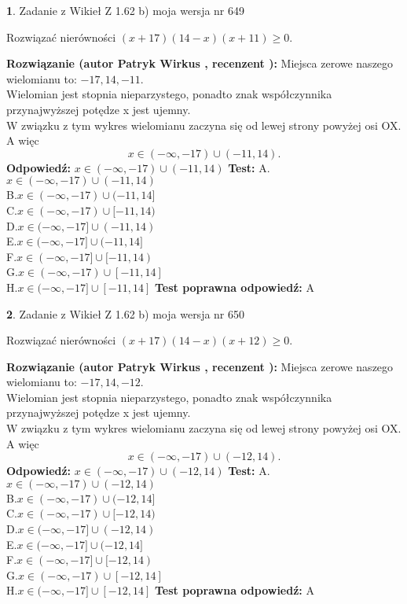 \documentclass[12pt, a4paper]{article}
\theoremstyle{definition} %
\newtheorem{zad}{}
\newcommand{\zadStart}[1]{\begin{zad}#1\newline}
\newcommand{\zadStop}{\end{zad}}
\newcommand{\rozwStart}[2]{\noindent \textbf{Rozwiązanie (autor #1 , recenzent #2): }\newline}
\newcommand{\rozwStop}{\newline}
\newcommand{\odpStart}{\noindent \textbf{Odpowiedź:}\newline}
\newcommand{\odpStop}{\newline}
\newcommand{\testStart}{\noindent \textbf{Test:}\newline}
\newcommand{\testStop}{\newline}
\newcommand{\kluczStart}{\noindent \textbf{Test poprawna odpowiedź:}\newline}
\newcommand{\kluczStop}{\newline}
\begin{document}
\zadStart{Zadanie z Wikieł Z 1.62 b) moja wersja nr 649}

Rozwiązać nierówności $(x+17)(14-x)(x+11)\ge0$.
\zadStop
\rozwStart{Patryk Wirkus}{}
Miejsca zerowe naszego wielomianu to: $-17, 14, -11$.\\
Wielomian jest stopnia nieparzystego, ponadto znak współczynnika przy\linebreak najwyższej potędze x jest ujemny.\\ W związku z tym wykres wielomianu zaczyna się od lewej strony powyżej osi OX. A więc $$x \in (-\infty,-17) \cup (-11,14).$$
\rozwStop
\odpStart
$x \in (-\infty,-17) \cup (-11,14)$
\odpStop
\testStart
A.$x \in (-\infty,-17) \cup (-11,14)$\\
B.$x \in (-\infty,-17) \cup (-11,14]$\\
C.$x \in (-\infty,-17) \cup [-11,14)$\\
D.$x \in (-\infty,-17] \cup (-11,14)$\\
E.$x \in (-\infty,-17] \cup (-11,14]$\\
F.$x \in (-\infty,-17] \cup [-11,14)$\\
G.$x \in (-\infty,-17) \cup [-11,14]$\\
H.$x \in (-\infty,-17] \cup [-11,14]$
\testStop
\kluczStart
A
\kluczStop



\zadStart{Zadanie z Wikieł Z 1.62 b) moja wersja nr 650}

Rozwiązać nierówności $(x+17)(14-x)(x+12)\ge0$.
\zadStop
\rozwStart{Patryk Wirkus}{}
Miejsca zerowe naszego wielomianu to: $-17, 14, -12$.\\
Wielomian jest stopnia nieparzystego, ponadto znak współczynnika przy\linebreak najwyższej potędze x jest ujemny.\\ W związku z tym wykres wielomianu zaczyna się od lewej strony powyżej osi OX. A więc $$x \in (-\infty,-17) \cup (-12,14).$$
\rozwStop
\odpStart
$x \in (-\infty,-17) \cup (-12,14)$
\odpStop
\testStart
A.$x \in (-\infty,-17) \cup (-12,14)$\\
B.$x \in (-\infty,-17) \cup (-12,14]$\\
C.$x \in (-\infty,-17) \cup [-12,14)$\\
D.$x \in (-\infty,-17] \cup (-12,14)$\\
E.$x \in (-\infty,-17] \cup (-12,14]$\\
F.$x \in (-\infty,-17] \cup [-12,14)$\\
G.$x \in (-\infty,-17) \cup [-12,14]$\\
H.$x \in (-\infty,-17] \cup [-12,14]$
\testStop
\kluczStart
A
\kluczStop
\end{document}
